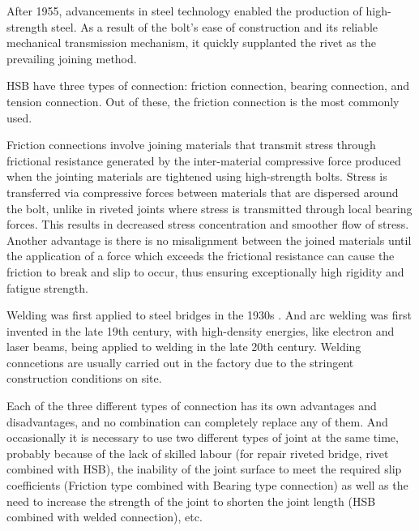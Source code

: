 After 1955, advancements in steel technology enabled the production of high-strength steel. As a result of the bolt's ease of construction and its reliable mechanical transmission mechanism, it quickly supplanted the rivet as the prevailing joining method.

\ac{HSB} have three types of connection: friction connection, bearing connection, and tension connection. Out of these, the friction connection is the most commonly used.

Friction connections involve joining materials that transmit stress through frictional resistance generated by the inter-material compressive force produced when the jointing materials are tightened using high-strength bolts. Stress is transferred via compressive forces between materials that are dispersed around the bolt, unlike in riveted joints where stress is transmitted through local bearing forces. This results in decreased stress concentration and smoother flow of stress. Another advantage is there is no misalignment between the joined materials until the application of a force which exceeds the frictional resistance can cause the friction to break and slip to occur, thus ensuring exceptionally high rigidity and fatigue strength.

Welding was first applied to steel bridges in the 1930s \cite{ALENCAR2019154}. And arc welding was first invented in the late 19th century, with high-density energies, like electron and laser beams, being applied to welding in the late 20th century. Welding conncetions are usually carried out in the factory due to the stringent construction conditions on site.


Each of the three different types of connection has its own advantages and disadvantages, and no combination can completely replace any of them. And occasionally it is necessary to use two different types of joint at the same time, probably because of the lack of skilled labour (for repair riveted bridge, rivet combined with HSB), the inability of the joint surface to meet the required slip coefficients (Friction type combined with Bearing type connection) as well as the need to increase the strength of the joint to shorten the joint length (HSB combined with welded connection), etc.



